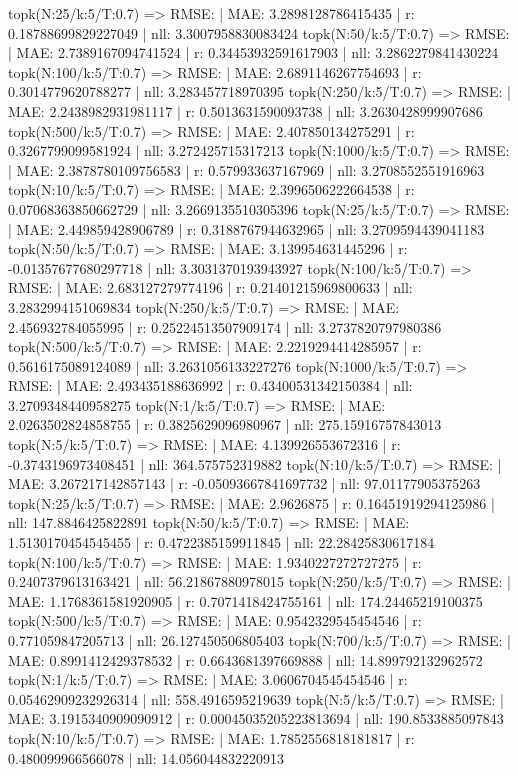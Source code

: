 topk(N:25/k:5/T:0.7) => RMSE: | MAE: 3.2898128786415435 | r: 0.18788699829227049 | nll: 3.3007958830083424
topk(N:50/k:5/T:0.7) => RMSE: | MAE: 2.7389167094741524 | r: 0.34453932591617903 | nll: 3.2862279841430224
topk(N:100/k:5/T:0.7) => RMSE: | MAE: 2.6891146267754693 | r: 0.3014779620788277 | nll: 3.283457718970395
topk(N:250/k:5/T:0.7) => RMSE: | MAE: 2.2438982931981117 | r: 0.5013631590093738 | nll: 3.2630428999907686
topk(N:500/k:5/T:0.7) => RMSE: | MAE: 2.407850134275291 | r: 0.3267799099581924 | nll: 3.272425715317213
topk(N:1000/k:5/T:0.7) => RMSE: | MAE: 2.3878780109756583 | r: 0.579933637167969 | nll: 3.2708552551916963
topk(N:10/k:5/T:0.7) => RMSE: | MAE: 2.3996506222664538 | r: 0.07068363850662729 | nll: 3.2669135510305396
topk(N:25/k:5/T:0.7) => RMSE: | MAE: 2.449859428906789 | r: 0.3188767944632965 | nll: 3.2709594439041183
topk(N:50/k:5/T:0.7) => RMSE: | MAE: 3.139954631445296 | r: -0.01357677680297718 | nll: 3.3031370193943927
topk(N:100/k:5/T:0.7) => RMSE: | MAE: 2.683127279774196 | r: 0.21401215969800633 | nll: 3.2832994151069834
topk(N:250/k:5/T:0.7) => RMSE: | MAE: 2.456932784055995 | r: 0.25224513507909174 | nll: 3.2737820797980386
topk(N:500/k:5/T:0.7) => RMSE: | MAE: 2.2219294414285957 | r: 0.5616175089124089 | nll: 3.2631056133227276
topk(N:1000/k:5/T:0.7) => RMSE: | MAE: 2.493435188636992 | r: 0.43400531342150384 | nll: 3.2709348440958275
topk(N:1/k:5/T:0.7) => RMSE: | MAE: 2.0263502824858755 | r: 0.3825629096980967 | nll: 275.15916757843013
topk(N:5/k:5/T:0.7) => RMSE: | MAE: 4.139926553672316 | r: -0.3743196973408451 | nll: 364.575752319882
topk(N:10/k:5/T:0.7) => RMSE: | MAE: 3.267217142857143 | r: -0.05093667841697732 | nll: 97.01177905375263
topk(N:25/k:5/T:0.7) => RMSE: | MAE: 2.9626875 | r: 0.16451919294125986 | nll: 147.8846425822891
topk(N:50/k:5/T:0.7) => RMSE: | MAE: 1.5130170454545455 | r: 0.4722385159911845 | nll: 22.28425830617184
topk(N:100/k:5/T:0.7) => RMSE: | MAE: 1.9340227272727275 | r: 0.2407379613163421 | nll: 56.21867880978015
topk(N:250/k:5/T:0.7) => RMSE: | MAE: 1.1768361581920905 | r: 0.7071418424755161 | nll: 174.24465219100375
topk(N:500/k:5/T:0.7) => RMSE: | MAE: 0.9542329545454546 | r: 0.771059847205713 | nll: 26.127450506805403
topk(N:700/k:5/T:0.7) => RMSE: | MAE: 0.8991412429378532 | r: 0.6643681397669888 | nll: 14.899792132962572
topk(N:1/k:5/T:0.7) => RMSE: | MAE: 3.0606704545454546 | r: 0.05462909232926314 | nll: 558.4916595219639
topk(N:5/k:5/T:0.7) => RMSE: | MAE: 3.1915340909090912 | r: 0.00045035205223813694 | nll: 190.8533885097843
topk(N:10/k:5/T:0.7) => RMSE: | MAE: 1.7852556818181817 | r: 0.480099966566078 | nll: 14.056044832220913
